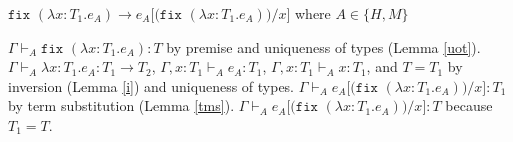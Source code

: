 \begin{case}
$\mathtt{fix}$ $(\lambda x:T_{1}.e_{A})\rightarrow e_{A}[(\mathtt{fix}$ $(\lambda x:T_{1}.e_{A}))/x]$ where $A\in\lbrace H,M\rbrace$

$\Gamma\vdash_{A}\mathtt{fix}$ $(\lambda x:T_{1}.e_{A}):T$ by premise and uniqueness of types (Lemma \ref{uot}).  $\Gamma\vdash_{A}\lambda x:T_{1}.e_{A}:T_{1}\rightarrow T_{2}$, $\Gamma,x:T_{1}\vdash_{A}e_{A}:T_{1}$, $\Gamma,x:T_{1}\vdash_{A}x:T_{1}$, and $T=T_{1}$ by inversion (Lemma \ref{i}) and uniqueness of types.  $\Gamma\vdash_{A}e_{A}[(\mathtt{fix}$ $(\lambda x:T_{1}.e_{A}))/x]:T_{1}$ by term substitution (Lemma \ref{tms}).  $\Gamma\vdash_{A}e_{A}[(\mathtt{fix}$ $(\lambda x:T_{1}.e_{A}))/x]:T$ because $T_{1}=T$.
\end{case}